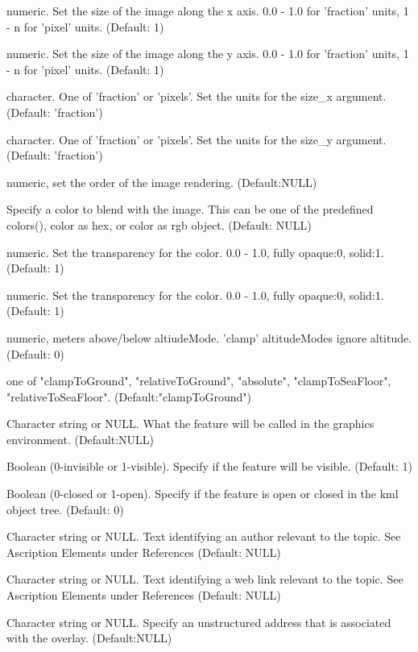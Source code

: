 \documentclass[a4paper]{book}
\begin{document}
\begin{Arguments}
\begin{ldescription}
\item[\code{size\_x}] numeric. Set the size of the image along the x axis. 0.0 - 1.0 for 'fraction' units, 1 - n for 'pixel' units. (Default: 1)
\item[\code{size\_y}] numeric. Set the size of the image along the y axis. 0.0 - 1.0 for 'fraction' units, 1 - n for 'pixel' units. (Default: 1)
\item[\code{size\_xunit}] character. One of 'fraction' or 'pixels'. Set the units for the size\_x argument. (Default: 'fraction')
\item[\code{size\_yunit}] character. One of 'fraction' or 'pixels'. Set the units for the size\_y argument. (Default: 'fraction') 
\item[\code{drawOrder}]  numeric, set the order of the image rendering. (Default:NULL) 
\item[\code{color}] Specify a color to blend with the image. This can be one of the predefined colors(), color as hex, or color as rgb object. (Default: NULL)
\item[\code{transparency}] numeric. Set the transparency for the color. 0.0 - 1.0, fully opaque:0, solid:1. (Default: 1)
\item[\code{rotation}] numeric. Set the transparency for the color. 0.0 - 1.0, fully opaque:0, solid:1. (Default: 1)
\item[\code{altitude}]  numeric, meters above/below altiudeMode. 'clamp' altitudeModes ignore altitude. (Default: 0)
\item[\code{altitudeMode}] one of "clampToGround", "relativeToGround", "absolute", "clampToSeaFloor", "relativeToSeaFloor". (Default:"clampToGround")
\item[\code{name}] Character string or NULL. What the feature will be called in the graphics environment. (Default:NULL) 
\item[\code{visibility}] Boolean (0-invisible or 1-visible). Specify if the feature will be visible. (Default: 1)
\item[\code{open}]  Boolean (0-closed or 1-open). Specify if the feature is open or closed in the kml object tree. (Default: 0)
\item[\code{atomauthor}]  Character string or NULL. Text identifying an author relevant to the topic. See Ascription Elements under References (Default: NULL) 
\item[\code{atomlinkhref}] Character string or NULL. Text identifying a web link relevant to the topic.  See Ascription Elements under References (Default: NULL) 
\item[\code{address}] Character string or NULL. Specify an unstructured address that is associated with the overlay. (Default:NULL) 

\end{ldescription}
\end{Arguments}
\end{document}
